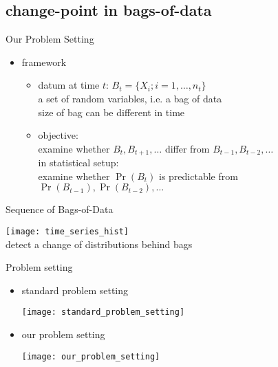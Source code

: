 \documentclass[fleqn,aspectratio=1610]{beamer}
\begin{document}
\subsection{change-point in bags-of-data}
\label{sec:orge7d9aa0}
\begin{frame}[label={sec:org1fbd2eb}]{Our Problem Setting}
\begin{itemize}
\item framework
\begin{itemize}
\item datum at time \(t\): \(B_t=\{X_i;i=1,\dotsc,n_t\}\) \\[0pt]
a set of random variables, i.e. a bag of data\\[0pt]
\alert{size of bag can be different in time}
\item objective: \\[0pt]
examine whether \(B_t,B_{t+1},\dotsc\) differ from 
\(B_{t-1},B_{t-2},\dotsc\) \\[4pt]
in statistical setup:\\[0pt]
\alert{examine whether \(\Pr(B_t)\) is predictable from \(\Pr(B_{t-1}),\Pr(B_{t-2}),\dotsc\)}

\nocite{KoshijimaHinoMurata2015}
\end{itemize}
\end{itemize}
\end{frame}

\begin{frame}[label={sec:org007d6e6}]{Sequence of Bags-of-Data}
\begin{center}
\texttt{[image: time\_series\_hist]}\\[0pt]
detect a change of distributions behind bags
\end{center}
\end{frame}

\begin{frame}[label={sec:org6028c8c}]{Problem setting}
\begin{itemize}
\item standard problem setting
\begin{center}
\texttt{[image: standard\_problem\_setting]}
\end{center}
\item \alert{our problem setting}
\begin{center}
\texttt{[image: our\_problem\_setting]}
\end{center}
\end{itemize}
\end{frame}
\end{document}
